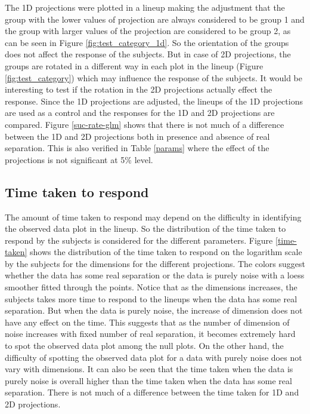 The 1D projections were plotted in a lineup making the adjustment that the group with the lower values of projection are always considered to be group 1 and the group with larger values of the projection are considered to be group 2, as can be seen in Figure \ref{fig:test_category_1d}. So the orientation of the groups does not affect the response of the subjects. But in case of 2D projections, the groups are rotated in a different way in each plot in the lineup (Figure \ref{fig:test_category}) which may influence the response of the subjects. It would be interesting to test if the rotation in the 2D projections actually effect the response. Since the 1D projections are adjusted, the lineups of the 1D projections are used as a control and the responses for the 1D and 2D projections are compared. Figure \ref{suc-rate-glm} shows that there is not much of a difference between the 1D and 2D projections both in presence and absence of real separation. This is also verified in Table \ref{params} where the effect of the projections is not significant at 5\% level.  


\subsection{Time taken to respond}

The amount of time taken to respond may depend on the difficulty in identifying the observed data plot in the lineup. So the distribution of the time taken to respond by the subjects is considered for the different parameters. Figure \ref{time-taken} shows the distribution of the time taken to respond on the logarithm scale by the subjects for the dimensions for the different projections. The colors suggest whether the data has some real separation or the data is purely noise with a loess smoother fitted through the points. Notice that as the dimensions increases, the subjects  takes more time to respond to the lineups when the data has some real separation. But when the data is purely noise, the increase of dimension does not have any effect on the time. This suggests that as the number of dimension of noise increases with fixed number of real separation, it becomes extremely hard to spot the observed data plot among the null plots. On the other hand, the difficulty of spotting the observed data plot for a data with purely noise does not vary with dimensions. It can also be seen that the time taken when the data is purely noise is overall higher than the time taken when the data has some real separation. There is not much of a difference between the time taken for 1D and 2D projections.



